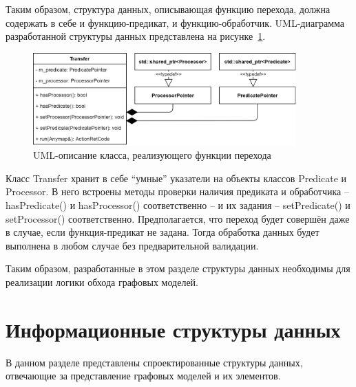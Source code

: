 Таким образом, структура данных, описывающая функцию перехода, должна содержать в себе и функцию-предикат, и функцию-обработчик. UML-диаграмма разработанной структуры данных представлена на рисунке~\ref{fig:UMLTransfer}.

\begin{figure}[!ht]
    \centering
    \includegraphics[width=0.90\textwidth]{figures/UML.transfer.png}
    \caption{UML-описание класса, реализующего функции перехода}
    \label{fig:UMLTransfer}
\end{figure}

Класс \textsf{Transfer} хранит в себе ``умные'' указатели на объекты классов \textsf{Predicate} и \textsf{Processor}. В него встроены методы проверки наличия предиката и обработчика -- \textsf{hasPredicate()} и \textsf{hasProcessor()} соответственно -- и их задания -- \textsf{setPredicate()} и \textsf{setProcessor()} соответственно. Предполагается, что переход будет совершён даже в случае, если функция-предикат не задана. Тогда обработка данных будет выполнена в любом случае без предварительной валидации.

Таким образом, разработанные в этом разделе структуры данных необходимы для реализации логики обхода графовых моделей.

\section{Информационные структуры данных}
В данном разделе представлены спроектированные структуры данных, отвечающие за представление графовых моделей и их элементов.

